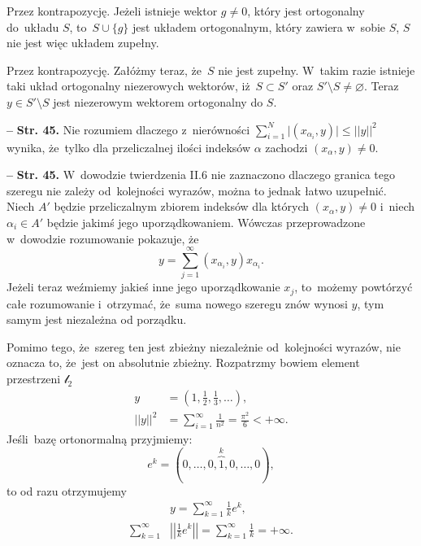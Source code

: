 \documentclass[a4paper,11pt]{article}
\let\emptyset\varnothing
\newcommand{\ld}{\ldots}
\newcommand{\fr}{\frac}
\newcommand{\tfr}{\tfrac}
\newcommand{\mc}{\mathcal}
\newcommand{\al}{\alpha}
\newcommand{\lc}{\mc{l}}
\newcommand{\set}[1]{\{ #1 \}}
\newcommand{\es}{\emptyset}
\newcommand{\subs}{\subset}
\newcommand{\setm}{\setminus}
\newcommand{\Sum}{\sum\limits}
\providecommand{\absj}[1]{\lvert #1 \rvert}
\newcommand{\norm}[1]{\left|\left| #1 \right|\right|}
\newcommand{\tb}{\textbf}
\newcommand{\noi}{\noindent}
\newcommand{\start}{\noi \tb{--} {}}
\newcommand{\Str}[1]{\tb{Str. #1.}}
\begin{document}
Przez kontrapozycję. Jeżeli istnieje wektor $g \neq 0$, który jest
ortogonalny do~układu $S$, to~$S \cup \set{ g }$ jest układem
ortogonalnym, który zawiera w~sobie $S$, $S$ nie jest więc układem
zupełny.

Przez kontrapozycję. Załóżmy teraz, że~$S$ nie jest zupełny. W~takim
razie istnieje taki układ ortogonalny niezerowych wektorów,
iż~$S \subs S'$ oraz $S' \setm S \neq \es$. Teraz $y \in S' \setm S$
jest niezerowym wektorem ortogonalny %
do $S$.

\start \Str{45} Nie rozumiem dlaczego z~nierówności
$\sum_{ i = 1 }^{ N } \absj{ ( x_{ \al_{ i } }, y ) } \leq \norm{ y
}^{ 2 }$ wynika, że~tylko dla przeliczalnej ilości indeksów $\al$
zachodzi $( x_{ \al }, y ) \neq 0$.

\start \Str{45} W~dowodzie twierdzenia II.6 nie zaznaczono dlaczego
granica tego szeregu nie zależy od~kolejności wyrazów, można to jednak
łatwo uzupełnić. Niech $A'$ będzie przeliczalnym zbiorem indeksów dla
których $( x_{ \al }, y ) \neq 0$ i~niech $\al_{ i } \in A'$ będzie
jakimś jego uporządkowaniem. Wówczas przeprowadzone w~dowodzie
rozumowanie pokazuje, że
\begin{equation}
  y = \Sum_{ j = 1 }^{ \infty } ( x_{ \al_{ i } }, y ) x_{ \al_{ i } }.
\end{equation}
Jeżeli teraz weźmiemy jakieś inne jego uporządkowanie $x_{ j }$,
to~możemy powtórzyć całe rozumowanie i~otrzymać, że~suma nowego
szeregu znów wynosi $y$, tym samym jest niezależna od porządku.

Pomimo tego, że~szereg ten jest zbieżny niezależnie od~kolejności
wyrazów, nie oznacza to, że~jest on absolutnie zbieżny. Rozpatrzmy
bowiem element przestrzeni $\lc_{ 2 }$
\begin{align*}
  y &= ( 1, \tfr{ 1 }{ 2 }, \tfr{ 1 }{ 3 },\ld ), \\
  \norm{ y }^{ 2 } &= \Sum_{ i = 1 }^{ \infty } \fr{ 1 }{ n^{ 2 } }
                     = \fr{ \pi^{ 2 } }{ 6 } < +\infty.
\end{align*}
Jeśli~bazę ortonormalną przyjmiemy:
\begin{equation*}
  e^{ k } = ( 0, \ld, 0, \overbrace{ 1 }^{ k }, 0, \ld, 0),
\end{equation*}
to od razu otrzymujemy
\begin{align*}
  &y = \Sum_{ k = 1 }^{ \infty } \tfr{ 1 }{ k } e^{ k }, \\
  \Sum_{ k = 1 }^{ \infty } &\norm{ \tfr{ 1 }{ k } e^{ k } }
                              = \Sum_{ k = 1 }^{ \infty } \tfr{ 1 }{ k }
                              = +\infty.
\end{align*}
\end{document}
